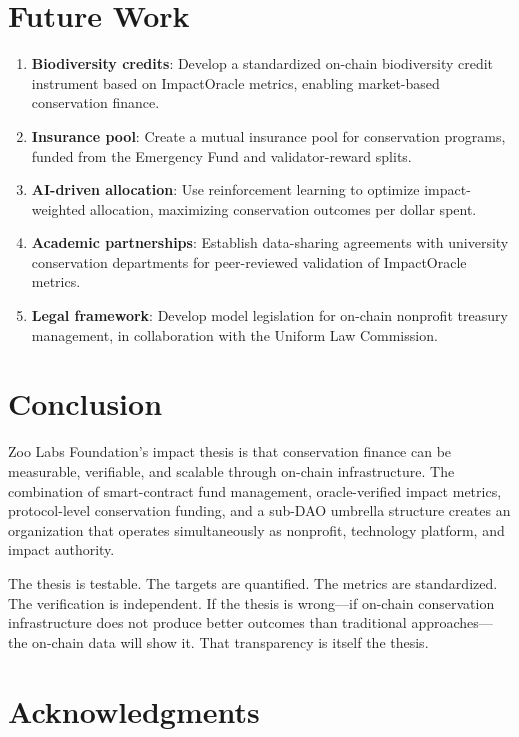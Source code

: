 \documentclass[11pt,letterpaper]{article}
\begin{document}
\section{Future Work}

\begin{enumerate}
    \item \textbf{Biodiversity credits}: Develop a standardized on-chain biodiversity credit instrument based on ImpactOracle metrics, enabling market-based conservation finance.
    \item \textbf{Insurance pool}: Create a mutual insurance pool for conservation programs, funded from the Emergency Fund and validator-reward splits.
    \item \textbf{AI-driven allocation}: Use reinforcement learning to optimize impact-weighted allocation, maximizing conservation outcomes per dollar spent.
    \item \textbf{Academic partnerships}: Establish data-sharing agreements with university conservation departments for peer-reviewed validation of ImpactOracle metrics.
    \item \textbf{Legal framework}: Develop model legislation for on-chain nonprofit treasury management, in collaboration with the Uniform Law Commission.
\end{enumerate}

\section{Conclusion}

Zoo Labs Foundation's impact thesis is that conservation finance can be measurable, verifiable, and scalable through on-chain infrastructure. The combination of smart-contract fund management, oracle-verified impact metrics, protocol-level conservation funding, and a sub-DAO umbrella structure creates an organization that operates simultaneously as nonprofit, technology platform, and impact authority.

The thesis is testable. The targets are quantified. The metrics are standardized. The verification is independent. If the thesis is wrong---if on-chain conservation infrastructure does not produce better outcomes than traditional approaches---the on-chain data will show it. That transparency is itself the thesis.

\section*{Acknowledgments}
\end{document}
